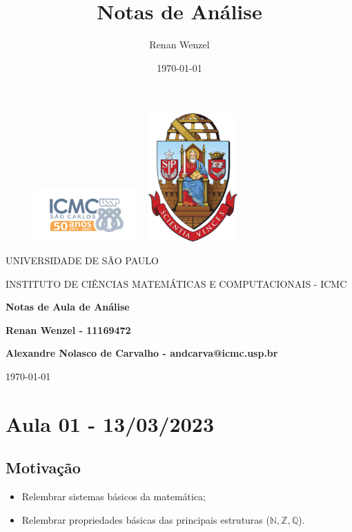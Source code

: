 \documentclass{article}
\title{Notas de An\'alise}
\author{Renan Wenzel}
\date{\today}
\begin{document}
 \begin{figure}[ht]
		\includegraphics[width=4cm]{icmc.png}
		\hspace{7cm}
		\includegraphics[height=4.9cm,width=4cm]{brasao_usp_cor.jpg}
	\endminipage	
\end{figure}

\begin{center}
	\vspace{1cm}
	\LARGE
	UNIVERSIDADE DE S\~AO PAULO

	\vspace{1.3cm}
	\LARGE
	INSTITUTO DE CI\^ENCIAS MATEM\'ATICAS E COMPUTACIONAIS - ICMC

	\vspace{1.7cm}
	\Large
	\textbf{Notas de Aula de An\'alise}

	\vspace{1.3cm}
	\large
	\textbf{Renan Wenzel - 11169472}

	\vspace{1.3cm}
	\large
	\textbf{Alexandre Nolasco de Carvalho - andcarva@icmc.usp.br}

	\vspace{1.3cm}
	\today
\end{center}

 \newpage

 \tableofcontents

 \newpage

\section{Aula 01 - 13/03/2023}
\subsection{Motiva\c c\~ao}
\begin{itemize}
  \item Relembrar sistemas b\'asicos da matem\'atica;
  \item Relembrar propriedades b\'asicas das principais estruturas ($\mathbb{N}, \mathbb{Z}, \mathbb{Q}$).
\end{itemize}
\end{document}

